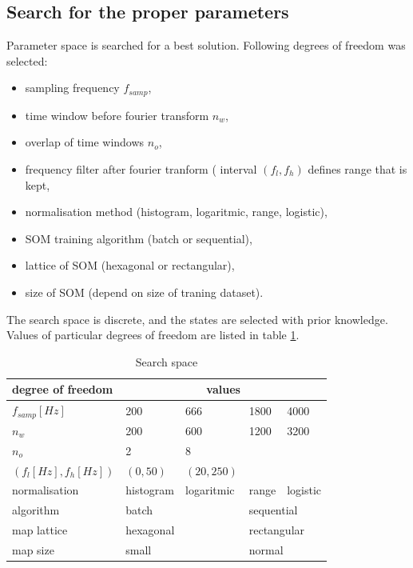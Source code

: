 \documentclass[a4paper,journal]{IEEEtran}
\begin{document}
\subsection{Search for the proper parameters}
Parameter space is searched for a best solution. Following degrees of 
freedom was selected:
\begin{itemize}
	\item sampling frequency $ f_{samp} $,
	\item time window before fourier transform $ n_w $,
	\item overlap of time windows $ n_o $,
	\item frequency filter after fourier tranform ( interval $ (f_l, f_h) $ defines 
	range that is kept,
	\item normalisation method (histogram, logaritmic, range, logistic),
	\item SOM training algorithm (batch or sequential),
	\item lattice of SOM (hexagonal or rectangular),
	\item size of SOM (depend on size of traning dataset).
\end{itemize}
The search space is discrete, and the states are selected with prior knowledge.
Values of particular degrees of freedom are listed  in table \ref{searchspace}.


\begin{table}[h]
\caption{Search space}
	\begin{center}
		\begin{tabular}{|l| p{1.2cm} p{1.2cm} p{1.2cm} p{1.2cm} |}			
			\hline
			degree of freedom & \multicolumn{4}{c|}{values} \\
			\hline
			\hline
			$ f_{samp} [Hz] $ & 200 & 666 & 1800 & 4000\\
			\hline
			$ n_w $ & 200 & 600 & 1200 & 3200 \\
			\hline
			$ n_o $ & 2 & 8 & & \\
			\hline
			$ (f_l[Hz], f_h[Hz]) $ & $ (0, 50) $ & $ (20, 250) $ & & \\
			\hline
			normalisation & histogram & logaritmic & range & logistic \\
			\hline
			algorithm & \multicolumn{2}{l}{batch} & \multicolumn{2}{l|}{sequential}  \\
			\hline
			map lattice & \multicolumn{2}{l}{hexagonal} & \multicolumn{2}{l|}{rectangular} \\
			\hline
			map size  & \multicolumn{2}{l}{small} & \multicolumn{2}{l|}{normal} \\
			\hline
		\end{tabular}
	\end{center}
\label{searchspace}
\end{table}
\end{document}
